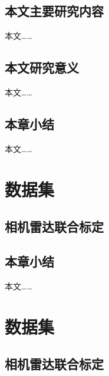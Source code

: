 \documentclass[UTF8,a4paper,12pt]{ctexart}
\numberwithin{equation}{section}
\begin{document}
\subsection{本文主要研究内容}
本文……
\subsection{本文研究意义}
本文……
\subsection{本章小结}
本文……




\newpage
{}
\section{数据集}

\subsection{相机雷达联合标定}



\subsection{本章小结}
本文……



\newpage
{}
\section{数据集}

\subsection{相机雷达联合标定}

\end{document}
